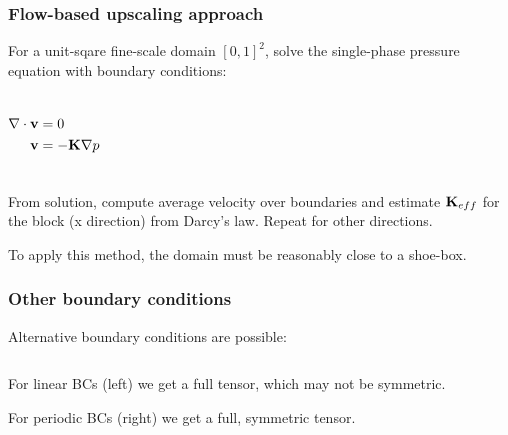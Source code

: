 \documentclass[UKenglish,10pt]{beamer}
\def\bfK{{\bf K}}
\def\bfv{{\bf v}}
\def\bfn{{\bf n}}
\begin{document}
\begin{frame}
  \frametitle{Flow-based upscaling approach}
  For a unit-sqare fine-scale domain $[0,1]^2$, solve the
  single-phase pressure equation with boundary conditions:

  \begin{columns}
    \begin{align*}
      \nabla\cdot\bfv  & = 0 \\
      \bfv & = -\bfK\nabla p \\
    \end{align*}
  \end{columns}
  \bigskip

  From solution, compute average velocity over boundaries and estimate
  $\bfK_{eff}$ for the block (x direction) from Darcy's law. Repeat for
  other directions.
  \bigskip

  To apply this method, the domain must be reasonably close to a shoe-box.
\end{frame}



\begin{frame}
  \frametitle{Other boundary conditions}
  Alternative boundary conditions are possible:

  \begin{columns}
  \end{columns}
  \bigskip

  For linear BCs (left) we get a full tensor, which may not be symmetric.
  \bigskip

  For periodic BCs (right) we get a full, symmetric tensor.
\end{frame}
\end{document}
